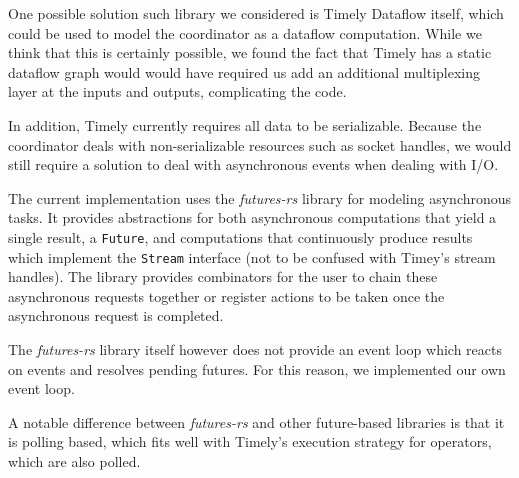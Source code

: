 One possible solution such library we considered is Timely Dataflow itself, which could
be used to model the coordinator as a dataflow computation.
While we think that this is certainly possible, we found the fact that Timely
has a static dataflow graph would would have required us add an additional
multiplexing layer at the inputs and outputs, complicating the code. 

In addition, Timely currently requires all data to be serializable. Because
the coordinator deals with non-serializable resources such as socket handles,
we would still require a solution to deal with asynchronous events when dealing
with I/O.

The current implementation uses the \emph{futures-rs} library for modeling
asynchronous tasks. It provides abstractions for both asynchronous computations
that yield a single result, a \lstinline{Future}, and computations that
continuously produce results which implement the \lstinline{Stream} interface
(not to be confused with Timey's stream handles). The library provides combinators
for the user to chain these asynchronous requests together or register actions
to be taken once the asynchronous request is completed.

The \emph{futures-rs} library itself however does not provide an event loop
which reacts on events and resolves pending futures. For this reason, we implemented
our own event loop. 

A notable difference between \emph{futures-rs} and other future-based libraries
is that it is polling based, which fits well with Timely's execution strategy
for operators, which are also polled.
